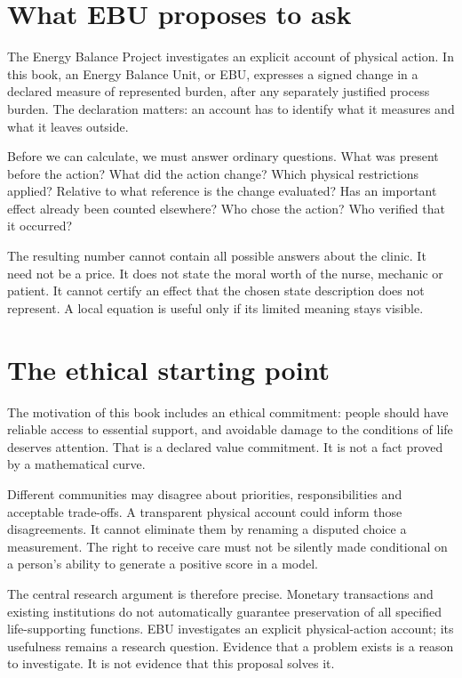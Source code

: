 
\section{What EBU proposes to ask}
The Energy Balance Project investigates an explicit account of physical action. In this book, an Energy Balance Unit, or EBU, expresses a signed change in a declared measure of represented burden, after any separately justified process burden. The declaration matters: an account has to identify what it measures and what it leaves outside.

Before we can calculate, we must answer ordinary questions. What was present before the action? What did the action change? Which physical restrictions applied? Relative to what reference is the change evaluated? Has an important effect already been counted elsewhere? Who chose the action? Who verified that it occurred?

The resulting number cannot contain all possible answers about the clinic. It need not be a price. It does not state the moral worth of the nurse, mechanic or patient. It cannot certify an effect that the chosen state description does not represent. A local equation is useful only if its limited meaning stays visible.

\section{The ethical starting point}
The motivation of this book includes an ethical commitment: people should have reliable access to essential support, and avoidable damage to the conditions of life deserves attention. That is a declared value commitment. It is not a fact proved by a mathematical curve.

Different communities may disagree about priorities, responsibilities and acceptable trade-offs. A transparent physical account could inform those disagreements. It cannot eliminate them by renaming a disputed choice a measurement. The right to receive care must not be silently made conditional on a person's ability to generate a positive score in a model.

The central research argument is therefore precise. Monetary transactions and existing institutions do not automatically guarantee preservation of all specified life-supporting functions. EBU investigates an explicit physical-action account; its usefulness remains a research question. Evidence that a problem exists is a reason to investigate. It is not evidence that this proposal solves it.

